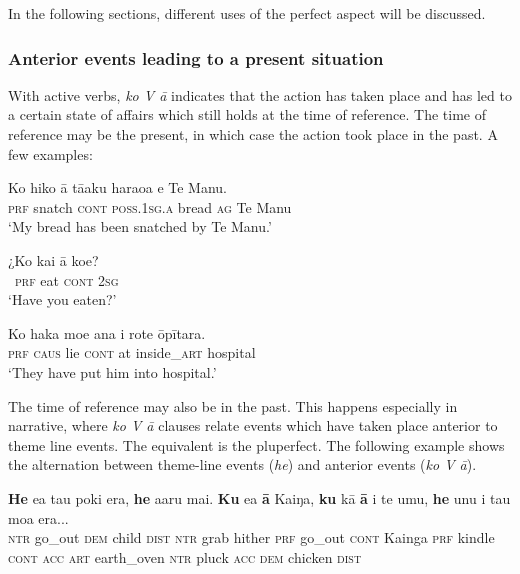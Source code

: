 In the following sections, different uses of the perfect aspect will be discussed. 

\subsubsection[Anterior events leading to a present situation]{Anterior events leading to a present situation}\label{sec:7.2.7.1}
With active verbs, \textit{ko V {\ꞌ}ā} indicates that the action has taken place and has led to a certain state of affairs which still holds at the time of reference. The time of reference may be the present, in which case the action took place in the past. A few examples:

\ea\label{ex:7.56}
\gll Ko hiko {\ꞌ}ā tā{\ꞌ}aku haraoa e Te Manu. \\
\textsc{prf} snatch \textsc{cont} \textsc{poss.1sg.a} bread \textsc{ag} Te Manu \\

\glt 
‘My bread has been snatched by Te Manu.’ \textstyleExampleref{[R245.039]} 
\z

\ea\label{ex:7.57}
\gll ¿Ko kai {\ꞌ}ā koe? \\
~\textsc{prf} eat \textsc{cont} \textsc{2sg} \\

\glt 
‘Have you eaten?’ \textstyleExampleref{[R245.058]} 
\z

\ea\label{ex:7.58}
\gll Ko haka moe {\ꞌ}ana {\ꞌ}i rote {\ꞌ}ōpītara. \\
\textsc{prf} \textsc{caus} lie \textsc{cont} at inside\_\textsc{art} hospital \\

\glt 
‘They have put him into hospital.’ \textstyleExampleref{[R210.122]} 
\z

The time of reference may also be in the past. This happens especially in narrative, where \textit{ko V {\ꞌ}ā} clauses relate events which have taken place anterior to theme line events. The  equivalent is the pluperfect. The following example shows the alternation between theme-line events (\textit{he}) and anterior events (\textit{ko V {\ꞌ}ā}).

\ea\label{ex:7.59}
\gll \textbf{He} e{\ꞌ}a tau poki era, \textbf{he} {\ꞌ}a{\ꞌ}aru mai. \textbf{Ku} e{\ꞌ}a \textbf{{\ꞌ}ā} Kaiŋa,  \textbf{ku} kā \textbf{{\ꞌ}ā} i te {\ꞌ}umu, \textbf{he} unu i tau moa era...\\
\textsc{ntr} go\_out \textsc{dem} child \textsc{dist} \textsc{ntr} grab hither \textsc{prf} go\_out \textsc{cont} Kainga  \textsc{prf} kindle \textsc{cont} \textsc{acc} \textsc{art} earth\_oven \textsc{ntr} pluck \textsc{acc} \textsc{dem} chicken \textsc{dist}\\

